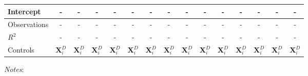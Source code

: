 \documentclass[11pt]{article}
\begin{document}
\begin{landscape}
\begin{table}[!htbp]
\begin{threeparttable}
\begin{tabular}{l||cc|cc|cc|cc|cc||cc||cc}
Intercept &- &- &- &- &- &- &- &- &-&- &- &- &- & -\\
\midrule
Observations                        &-    &-    &-    &-    &-    &- &-    &-    &-    &-&-    &-    &-    &-    \\
$R^2$                               &-    &-    &-    &-    &-    &- &-    &-    &-    &-&-    &-    &-    &-    \\
Controls                 &  $\mathbf{X}_{i}^{D}$&  $\mathbf{X}_{i}^{D}$&  $\mathbf{X}_{i}^{D}$&  $\mathbf{X}_{i}^{D}$ &  $\mathbf{X}_{i}^{D}$&  $\mathbf{X}_{i}^{D}$ &  $\mathbf{X}_{i}^{D}$&  $\mathbf{X}_{i}^{D}$&  $\mathbf{X}_{i}^{D}$&  $\mathbf{X}_{i}^{D}$&  $\mathbf{X}_{i}^{D}$&  $\mathbf{X}_{i}^{D}$&  $\mathbf{X}_{i}^{D}$ &  $\mathbf{X}_{i}^{D}$   \\
\bottomrule
\end{tabular}
\begin{tablenotes}[flushleft]
\footnotesize
\item \textit{Notes}:   
\end{tablenotes}
\end{threeparttable}
\end{table}
\end{landscape}
\end{document}
